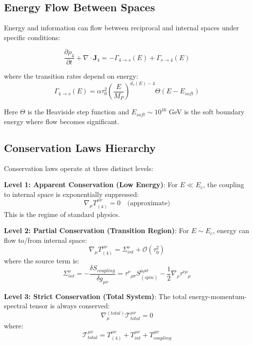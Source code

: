 \subsection{Energy Flow Between Spaces}

Energy and information can flow between reciprocal and internal spaces under specific conditions:

\begin{equation}
    \frac{\partial \rho_4}{\partial t} + \nabla \cdot \mathbf{J}_4 = -\Gamma_{4 \to s}(E) + \Gamma_{s \to 4}(E)
\end{equation}

where the transition rates depend on energy:
\begin{equation}
    \Gamma_{4 \to s}(E) = \alpha \tau_0^2 \left(\frac{E}{M_P}\right)^{d_s(E) - 4} \Theta(E - E_{soft})
\end{equation}

Here $\Theta$ is the Heaviside step function and $E_{soft} \sim 10^{16}$ GeV is the soft boundary energy where flow becomes significant.

\subsection{Conservation Laws Hierarchy}

Conservation laws operate at three distinct levels:

\textbf{Level 1: Apparent Conservation (Low Energy)}:
For $E \ll E_c$, the coupling to internal space is exponentially suppressed:
\begin{equation}
    \nabla_\mu T^{\mu\nu}_{(4)} = 0 \quad \text{(approximate)}
\end{equation}
This is the regime of standard physics.

\textbf{Level 2: Partial Conservation (Transition Region)}:
For $E \sim E_c$, energy can flow to/from internal space:
\begin{equation}
    \nabla_\mu T^{\mu\nu}_{(4)} = \Sigma^\nu_{int} + \mathcal{O}(\tau_0^2)
\end{equation}
where the source term is:
\begin{equation}
    \Sigma^\nu_{int} = -\frac{\delta S_{coupling}}{\delta g_{\mu\nu}} = \tau^\nu{}_{\rho\sigma} S^{\mu\rho\sigma}_{(spin)} - \frac{1}{2}\nabla_\rho \tau^{\nu\rho}{}_\mu
\end{equation}

\textbf{Level 3: Strict Conservation (Total System)}:
The total energy-momentum-spectral tensor is always conserved:
\begin{equation}
    \nabla^{(total)}_\mu \mathcal{T}^{\mu\nu}_{total} = 0
\end{equation}
where:
\begin{equation}
    \mathcal{T}^{\mu\nu}_{total} = T^{\mu\nu}_{(4)} + T^{\mu\nu}_{int} + T^{\mu\nu}_{coupling}
\end{equation}

